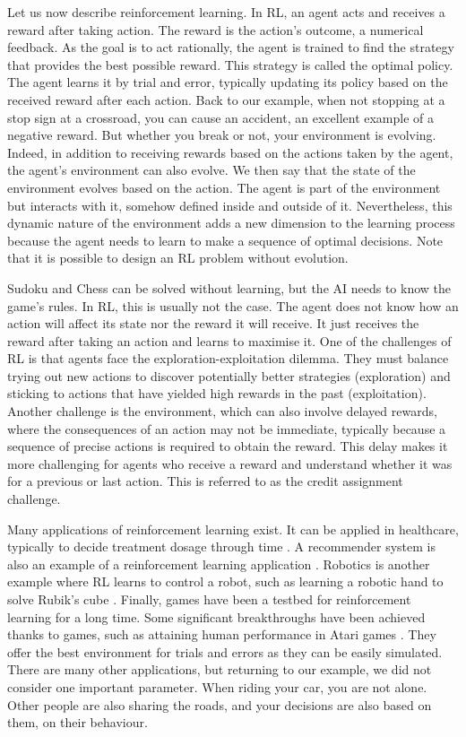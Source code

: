 Let us now describe reinforcement learning.
In RL, an agent acts and receives a reward after taking action.
The reward is the action's outcome, a numerical feedback.
As the goal is to act rationally, the agent is trained to find the strategy that provides the best possible reward.
This strategy is called the optimal policy.
The agent learns it by trial and error, typically updating its policy based on the received reward after each action.
Back to our example, when not stopping at a stop sign at a crossroad, you can cause an accident, an excellent example of a negative reward.
But whether you break or not, your environment is evolving.
Indeed, in addition to receiving rewards based on the actions taken by the agent, the agent's environment can also evolve.
We then say that the state of the environment evolves based on the action.
The agent is part of the environment but interacts with it, somehow defined inside and outside of it.
Nevertheless, this dynamic nature of the environment adds a new dimension to the learning process because the agent needs to learn to make a sequence of optimal decisions.
Note that it is possible to design an RL problem without evolution.

Sudoku and Chess can be solved without learning, but the AI needs to know the game's rules.
In RL, this is usually not the case.
The agent does not know how an action will affect its state nor the reward it will receive.
It just receives the reward after taking an action and learns to maximise it.
One of the challenges of RL is that agents face the exploration-exploitation dilemma.
They must balance trying out new actions to discover potentially better strategies (exploration) and sticking to actions that have yielded high rewards in the past (exploitation).
Another challenge is the environment, which can also involve delayed rewards, where the consequences of an action may not be immediate, typically because a sequence of precise actions is required to obtain the reward. 
This delay makes it more challenging for agents who receive a reward and understand whether it was for a previous or last action.
This is referred to as the credit assignment challenge.

Many applications of reinforcement learning exist.
It can be applied in healthcare, typically to decide treatment dosage through time \citep{miotto2018deep}.
A recommender system is also an example of a reinforcement learning application \citep{mcinerney2018explore}.
Robotics is another example where RL learns to control a robot, such as learning a robotic hand to solve Rubik's cube \citep{akkaya2019solving}.
Finally, games have been a testbed for reinforcement learning for a long time.
Some significant breakthroughs have been achieved thanks to games, such as attaining human performance in Atari games \citep{Mnih2015}.
They offer the best environment for trials and errors as they can be easily simulated.
There are many other applications, but returning to our example, we did not consider one important parameter.
When riding your car, you are not alone.
Other people are also sharing the roads, and your decisions are also based on them, on their behaviour.

